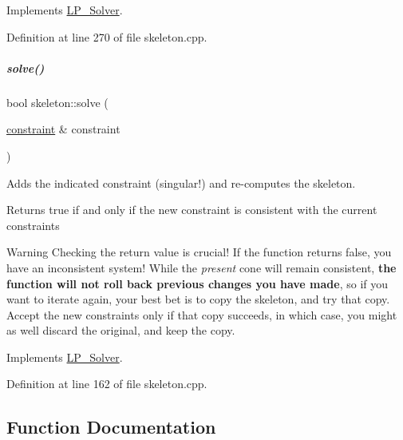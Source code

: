 Implements \hyperlink{group___c_l_s_solvers_a35da4bdf5db971c445f495b6eaab072d}{L\+P\+\_\+\+Solver}.



Definition at line 270 of file skeleton.\+cpp.

\mbox{\label{group___c_l_s_solvers_a8add1433d3bc6b1a8588f0f88134599f}} 
\subparagraph{\texorpdfstring{solve()}{solve()}\hspace{0.1cm}{\footnotesize\ttfamily [2/2]}}
{\footnotesize\ttfamily bool skeleton\+::solve (\begin{DoxyParamCaption}\item[{\hyperlink{group___c_l_s_solvers_classconstraint}{constraint} \&}]{constraint }\end{DoxyParamCaption})\hspace{0.3cm}{\ttfamily [virtual]}}



Adds the indicated constraint (singular!) and re-\/computes the skeleton. 

\begin{DoxyReturn}{Returns}
{\ttfamily true} if and only if the new constraint is consistent with the current constraints
\end{DoxyReturn}
\begin{DoxyWarning}{Warning}
Checking the return value is crucial! If the function returns {\ttfamily false}, you have an inconsistent system! While the {\itshape present} cone will remain consistent, {\bfseries the function will not roll back previous changes you have made}, so if you want to iterate again, your best bet is to copy the skeleton, and try that copy. Accept the new constraints only if that copy succeeds, in which case, you might as well discard the original, and keep the copy. 
\end{DoxyWarning}


Implements \hyperlink{group___c_l_s_solvers_abd84374c52124116becc8924dc74e12d}{L\+P\+\_\+\+Solver}.



Definition at line 162 of file skeleton.\+cpp.



\subsection{Function Documentation}
\mbox{\label{group___c_l_s_solvers_gacb5ce7e22db91b33c26ea0be6a6026de}} 
